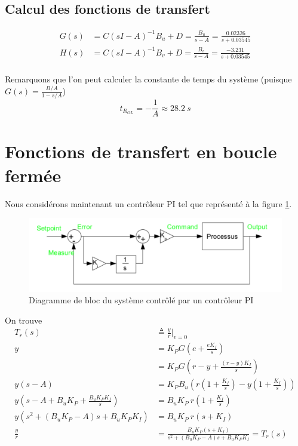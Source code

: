 \documentclass[frenchb, paper=a4, fontsize=11pt]{scrartcl}
\numberwithin{equation}{section}					%
\numberwithin{figure}{section}					%
\numberwithin{table}{section}						%
\begin{document}
\subsection{Calcul des fonctions de transfert}
\begin{align}
G(s) &= C(sI-A)^{-1}B_u + D = \frac{B_u}{s-A}= \frac{0.02326}{s+0.03545}\\
H(s) &= C(sI-A)^{-1}B_v + D = \frac{B_v}{s-A} = \frac{-3.231}{s+0.03545}\\
\end{align}

Remarquons que l'on peut calculer la constante de temps du système (puisque $G(s) = \frac{B/A}{1-s/A}$)
\begin{equation}
t_{R_{OL}} = -\frac{1}{A} \approx \SI{28.2}{s}
\end{equation}

\section{Fonctions de transfert en boucle fermée}

Nous considérons maintenant un contrôleur PI tel que représenté à la figure \ref{fig:closed_loop}.

\begin{figure}[!ht]
	\centering
	\includegraphics[width=\linewidth]{img/closed_loop.png}
	\caption{Diagramme de bloc du système contrôlé par un contrôleur PI}
	\label{fig:closed_loop}
\end{figure}


On trouve
\begin{align}
T_r(s) & \triangleq \frac{y}{r}\rvert_{v=0}\\
y &= K_P G \left(e+\frac{eK_I}{s} \right)\\
& = K_P G\left(r-y+\frac{(r-y)K_I}{s} \right)\\
y(s-A) & = K_P B_u\left( r(1+\frac{K_I}{s}) - y(1+\frac{K_I}{s})\right)\\
y(s-A + B_uK_P + \frac{B_uK_P K_I}{s}) & = B_uK_P  \ r \left(1+\frac{K_I}{s} \right) \\
y(s^2 +(B_uK_P-A)s + B_uK_P K_I) & = B_uK_P  \ r \left(s+K_I \right) \\
\frac{y}{r}&= \frac{B_uK_P  (s+K_I )}{s^2 +(B_uK_P-A)s + B_u K_P K_I} = T_r(s)
\end{align}
\end{document}
